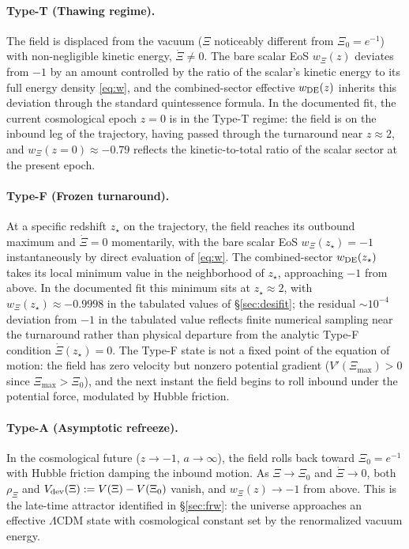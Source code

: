 \documentclass[11pt,reqno]{amsart}
\theoremstyle{plain}
\theoremstyle{definition}
\theoremstyle{remark}
\begin{document}
\paragraph{Type-T (Thawing regime).}
The field is displaced from the vacuum ($\Xi$ noticeably different from
$\Xi_0 = e^{-1}$) with non-negligible kinetic energy, $\dot\Xi \neq 0$.
The bare scalar EoS $w_\Xi(z)$ deviates from $-1$ by an amount controlled
by the ratio of the scalar's kinetic energy to its full energy density
\eqref{eq:w}, and the combined-sector effective $w_{\rm DE}(z)$ inherits
this deviation through the standard quintessence formula. In the
documented fit, the current cosmological epoch $z = 0$ is in the Type-T
regime: the field is on the inbound leg of the trajectory, having
passed through the turnaround near $z \approx 2$, and
$w_\Xi(z = 0) \approx -0.79$ reflects the kinetic-to-total ratio of
the scalar sector at the present epoch.

\paragraph{Type-F (Frozen turnaround).}
At a specific redshift $z_\star$ on the trajectory, the field reaches
its outbound maximum and $\dot\Xi = 0$ momentarily, with the bare
scalar EoS $w_\Xi(z_\star) = -1$ instantaneously by direct evaluation
of \eqref{eq:w}. The combined-sector $w_{\rm DE}(z_\star)$ takes its
local minimum value in the neighborhood of $z_\star$, approaching
$-1$ from above. In the documented fit this minimum sits at
$z_\star \approx 2$, with $w_\Xi(z_\star) \approx -0.9998$ in the
tabulated values of \S\ref{sec:desifit}; the residual $\sim 10^{-4}$
deviation from $-1$ in the tabulated value reflects finite numerical
sampling near the turnaround rather than physical departure from the
analytic Type-F condition $\dot\Xi(z_\star) = 0$. The Type-F state is
not a fixed point of the equation of motion: the field has zero
velocity but nonzero potential gradient ($V'(\Xi_{\max}) > 0$ since
$\Xi_{\max} > \Xi_0$), and the next instant the field begins to roll
inbound under the potential force, modulated by Hubble friction.

\paragraph{Type-A (Asymptotic refreeze).}
In the cosmological future ($z \to -1$, $a \to \infty$), the field
rolls back toward $\Xi_0 = e^{-1}$ with Hubble friction damping the
inbound motion. As $\Xi \to \Xi_0$ and $\dot\Xi \to 0$, both $\rho_\Xi$
and $V_{\rm dev}(\Xi) := V(\Xi) - V(\Xi_0)$ vanish, and $w_\Xi(z) \to -1$
from above. This is the late-time attractor identified in
\S\ref{sec:frw}: the universe approaches an effective $\Lambda$CDM
state with cosmological constant set by the renormalized vacuum
energy.
\end{document}
